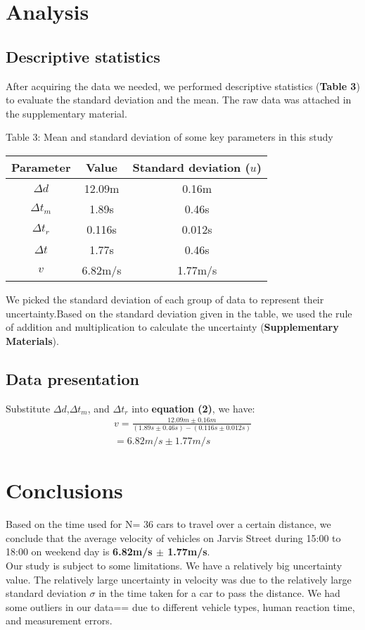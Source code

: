 \documentclass[10pt,twocolumn,letterpaper]{article}
\begin{document}
\section{Analysis}
\subsection{Descriptive statistics}
After acquiring the data we needed, we performed descriptive statistics (\textbf{Table 3}) to evaluate the standard deviation and the mean. The raw data was attached in the supplementary material.

\begin{center}
	Table 3: Mean and standard deviation of some key parameters in this study\\
	\begin{tabular}{ccc}
	\toprule
	Parameter& Value & Standard deviation ($u$)\\
	\midrule
	$\Delta d$& 12.09m & 0.16m\\
	$\Delta t_m$ & 1.89s & 0.46s\\
	$\Delta t_r$ & 0.116s & 0.012s\\
	$\Delta t$ & 1.77s & 0.46s\\
	$v$ & 6.82m/s & 1.77m/s\\
	\bottomrule
\end{tabular}
\end{center}
We picked the standard deviation of each group of data to represent their uncertainty.Based on the standard deviation given in the table, we used the rule of addition and multiplication to calculate the uncertainty (\textbf{Supplementary Materials}). 
\subsection{Data presentation}
Substitute $\Delta d$,$\Delta t_m$, and $\Delta t_r$ into \textbf{equation (2)}, we have:
\begin{equation}
	\begin{split}
		 v = \frac{12.09m\pm 0.16m}{(1.89s\pm 0.46s)-(0.116s\pm0.012s)}\\
		 = 6.82m/s \pm 1.77m/s
	\end{split}
\end{equation}

\section*{Conclusions}
Based on the time used for N= 36 cars to travel over a certain distance, we conclude that the average velocity of vehicles on Jarvis Street during 15:00 to 18:00 on weekend day is \textbf{6.82m/s $\pm$ 1.77m/s}. 
\\Our study is subject to some limitations. We have a relatively big uncertainty value. The relatively large uncertainty in velocity was due to the relatively large standard deviation $\sigma$ in the time taken for a car to pass the distance. We had some outliers in our data== due to different vehicle types, human reaction time, and measurement errors.
\end{document}
